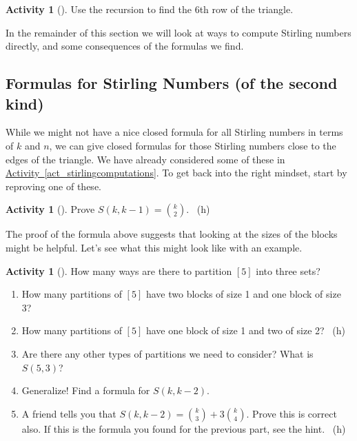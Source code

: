 \documentclass[10pt,]{book}
\theoremstyle{plain}
\theoremstyle{definition}
\theoremstyle{definition}
\theoremstyle{definition}
\newtheorem{activity}[project]{Activity}
\numberwithin{equation}{chapter}
\begin{document}
\begin{activity}[]\label{activity-265}
\hypertarget{p-1394}{}%
Use the recursion to find the 6th row of the triangle.%
\end{activity}
\hypertarget{p-1395}{}%
In the remainder of this section we will look at ways to compute Stirling numbers directly, and some consequences of the formulas we find.%
\typeout{************************************************}
\typeout{************************************************}
\subsection[{Formulas for Stirling Numbers (of the second kind)}]{Formulas for Stirling Numbers (of the second kind)}\label{subsec-stirlingformulas}
\hypertarget{p-1396}{}%
While we might not have a nice closed formula for all Stirling numbers in terms of \(k\) and \(n\), we can give closed formulas for those Stirling numbers close to the edges of the triangle.  We have already considered some of these in \hyperref[act_stirlingcomputations]{Activity~\ref{act_stirlingcomputations}}.  To get back into the right mindset, start by reproving one of these.%
\begin{activity}[]\label{activity-266}
\hypertarget{p-1397}{}%
Prove \(S(k, k-1) = \binom{k}{2}\).%
~{\tiny (h)}\end{activity}
\hypertarget{p-1400}{}%
The proof of the formula above suggests that looking at the sizes of the blocks might be helpful.  Let's see what this might look like with an example.%
\begin{activity}[]\label{activity-267}
\hypertarget{p-1401}{}%
How many ways are there to partition \([5]\) into three sets?%
\begin{enumerate}[font=\bfseries,label=(\alph*),ref=\alph*]
\item\label{task-254} \hypertarget{p-1402}{}%
How many partitions of \([5]\) have two blocks of size 1 and one block of size 3?%
\item\label{task-255} \hypertarget{p-1403}{}%
How many partitions of \([5]\) have one block of size 1 and two of size 2?%
~{\tiny (h)}\item\label{task-256} \hypertarget{p-1405}{}%
Are there any other types of partitions we need to consider?  What is \(S(5,3)\)?%
\item\label{task-257} \hypertarget{p-1406}{}%
Generalize! Find a formula for \(S(k, k-2)\).%
\item\label{task-258} \hypertarget{p-1407}{}%
A friend tells you that \(S(k,k-2) = \binom{k}{3} + 3 \binom{k}{4}\).  Prove this is correct also.  If this is the formula you found for the previous part, see the hint.%
~{\tiny (h)}\end{enumerate}
\end{activity}
\end{document}
